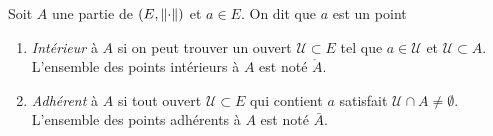                                 \begin{definition}
                                    Soit $A$ une partie de $(E,\left\lVert\cdot\right\rVert)$ et $a\in E$. On dit que $a$ est un point
                                    \begin{enumerate}
                                        \item	\emph{Intérieur} à $A$ si on peut trouver un ouvert $\mathcal U \subset E$ tel que $a\in \mathcal U$ et $\mathcal U \subset A$. L'ensemble des points intérieurs à $A$ est noté $\mathring{A}$.
                                        \item	\emph{Adhérent} à $A$ si tout ouvert $\mathcal U \subset E$ qui contient $a$ satisfait $\mathcal U \cap A \neq \emptyset $. L'ensemble des points adhérents à $A$ est noté $\bar{A}$.
                                    \end{enumerate}
                                \end{definition}

